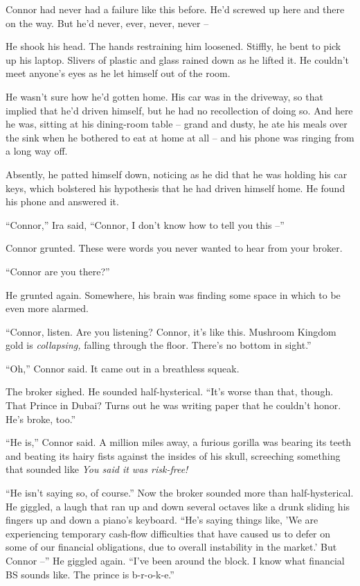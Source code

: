 Connor had never had a failure like this before. He'd screwed up
here and there on the way. But he'd never, ever, never, never --

He shook his head. The hands restraining him loosened. Stiffly, he
bent to pick up his laptop. Slivers of plastic and glass rained
down as he lifted it. He couldn't meet anyone's eyes as he let
himself out of the room.

He wasn't sure how he'd gotten home. His car was in the driveway,
so that implied that he'd driven himself, but he had no
recollection of doing so. And here he was, sitting at his
dining-room table -- grand and dusty, he ate his meals over the
sink when he bothered to eat at home at all -- and his phone was
ringing from a long way off.

Absently, he patted himself down, noticing as he did that he was
holding his car keys, which bolstered his hypothesis that he had
driven himself home. He found his phone and answered it.

``Connor,'' Ira said, ``Connor, I don't know how to tell you this --''

Connor grunted. These were words you never wanted to hear from your
broker.

``Connor are you there?''

He grunted again. Somewhere, his brain was finding some space in
which to be even more alarmed.

``Connor, listen. Are you listening? Connor, it's like this.
Mushroom Kingdom gold is \emph{collapsing,} falling through the
floor. There's no bottom in sight.''

``Oh,'' Connor said. It came out in a breathless squeak.

The broker sighed. He sounded half-hysterical. ``It's worse than
that, though. That Prince in Dubai? Turns out he was writing paper
that he couldn't honor. He's broke, too.''

``He is,'' Connor said. A million miles away, a furious gorilla was
bearing its teeth and beating its hairy fists against the insides
of his skull, screeching something that sounded like
\emph{You said it was risk-free!}

``He isn't saying so, of course.'' Now the broker sounded more than
half-hysterical. He giggled, a laugh that ran up and down several
octaves like a drunk sliding his fingers up and down a piano's
keyboard. ``He's saying things like, 'We are experiencing temporary
cash-flow difficulties that have caused us to defer on some of our
financial obligations, due to overall instability in the market.'
But Connor --'' He giggled again. ``I've been around the block. I
know what financial BS sounds like. The prince is b-r-o-k-e.''

